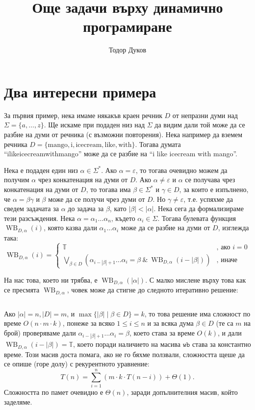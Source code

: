 \documentclass{article}
\title{Още задачи върху динамично програмиране}
\author{Тодор Дуков}
\date{}
\newcommand{\T}{\mathbb{T}}
\theoremstyle{definition}
\theoremstyle{plain}
\theoremstyle{remark}
\theoremstyle{definition}
\begin{document}
\maketitle

\section*{Два интересни примера}

За първия пример, нека имаме някакъв краен речник $D$ от непразни думи над $\Sigma = \{ a, \dots, z \}$.
Ще искаме при подаден низ над $\Sigma$ да видим дали той може да се разбие на думи от речника (с възможни повторения).
Нека например да вземем речника $D = \{ \text{mango}, \text{i}, \text{icecream}, \text{like}, \text{with} \}$.
Тогава думата ``ilikeicecreamwithmango'' може да се разбие на ``i like icecream with mango''.

Нека е подаден един низ $\alpha \in \Sigma^*$.
Ако $\alpha = \varepsilon$, то тогава очевидно можем да получим $\alpha$ чрез конкатенация на думи от $D$.
Ако $\alpha \neq \varepsilon$ и $\alpha$ се получава чрез конкатенация на думи от $D$, то тогава има $\beta \in \Sigma^*$ и $\gamma \in D$, за които е изпълнено, че $\alpha = \beta \gamma$ и $\beta$ може да се получи чрез думи от $D$.
Но $\gamma \neq \varepsilon$, т.е. успяхме да сведем задачата за $\alpha$ до задача за $\beta$, като $|\beta| < |\alpha|$.
Нека сега да формализираме тези разсъждения.
Нека $\alpha = \alpha_1 \dots \alpha_n$, където $\alpha_i \in \Sigma$.
Тогава булевата функция $\operatorname{WB}_{D, \alpha}(i)$, която казва дали $\alpha_1 \dots \alpha_i$ може да се разбие на думи от $D$, изглежда така:
\[
  \operatorname{WB}_{D, \alpha}(i) = \begin{cases}
    \T                                                                                                                                 & \text{, ако } i = 0 \\
    \bigvee\limits_{\beta \in D} (\alpha_{i - |\beta| + 1} \dots \alpha_i = \beta \: \& \: \operatorname{WB}_{D, \alpha}(i - |\beta|)) & \text{, иначе}
  \end{cases}
\]

На нас това, което ни трябва, е $\operatorname{WB}_{D, \alpha}(|\alpha|)$.
С малко мислене върху това как се пресмята $\operatorname{WB}_{D, \alpha}$, човек може да стигне до следното итеративно решение:
\inputminted[linenos]{c++}{algorithms/word_break.cpp}
Ако $|\alpha| = n, |D| = m$, и $\max \{ |\beta| \mid \beta \in D \} = k$, то това решение има сложност по време $O(n \cdot m \cdot k)$, понеже за всяко $1 \leq i \leq n$ и за всяка дума $\beta \in D$ (те са $m$ на брой) проверяваме дали $\alpha_{i - |\beta| + 1} \dots \alpha_i = \beta$, което става за време $O(k)$, и дали $\operatorname{WB}_{D, \alpha}(i - |\beta|) = \T$, което поради наличието на масива $\mathtt{wb}$ става за константно време.
Този масив доста помага, ако не го бяхме ползвали, сложността щеше да се опише (горе долу) с рекурентното уравнение:
\[
  T(n) = \sum\limits_{i = 1}^{n} (m \cdot k \cdot T(n - i)) + \Theta(1).
\]
Сложността по памет очевидно е $\Theta(n)$, заради допълнителния масив, който заделяме.
\end{document}
